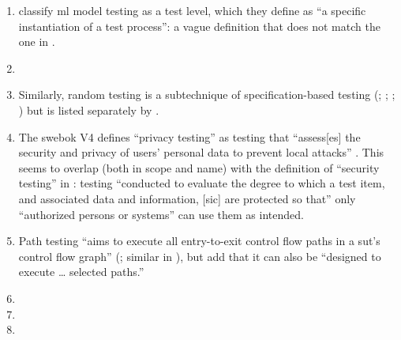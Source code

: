 \begin{enumerate}
    \item %
          \citetISTQB{} classify \acs{ml} model testing as a test level, which
          they define as ``a specific instantiation of a test process'': a vague
          definition that does not match the one in .
    \item %
          \perfSecParFlaw{}
    \item %
          Similarly, random testing is a subtechnique of specification-based
          testing (\citealp[pp.~7, 22]{IEEE2022}; \citeyear[pp.~5, 20, Fig.~2]{IEEE2021b};
          \citealp[p.~5\=/12]{SWEBOK2024}; \citealpISTQB{}) but is listed
          separately by \citet[p.~46]{Firesmith2015}.
    \item %
          The \acs{swebok} V4 defines ``privacy testing'' as testing that
          ``assess[es] the security and privacy of users' personal data to
          prevent local attacks'' \citep[p.~5\=/10]{SWEBOK2024}. This seems to
          overlap (both in scope and name) with the definition of ``security
          testing'' in \citep[p.~7]{IEEE2022}: testing
          ``conducted to evaluate the degree to which a test item, and
          associated data and information, [sic] are protected so that'' only
          ``authorized persons or systems'' can use them as intended.
    \item %
          Path testing ``aims to execute all entry-to-exit control flow paths
          in a \acs{sut}'s control flow graph'' (\citealp[p.~5\=/13]{SWEBOK2024};
          similar in \citealp[p.~119]{Patton2006}), but \citet[p.~316]{IEEE2017}
          add that it can also be ``designed to execute \dots{} selected paths.''
    \item %
          \tourFlaw{}
    \item %
          \alphaFlaw{}
    \item %

\end{enumerate}

